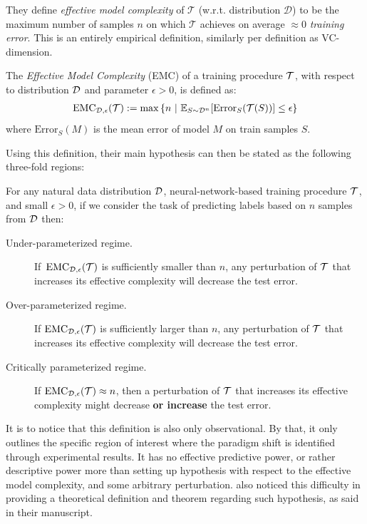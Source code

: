 \documentclass[10pt,oneside,oldfontcommands,dvipsnames,article]{memoir}
\begin{document}
They define \emph{effective model complexity} of $\mathcal{T}$ (w.r.t. distribution $\mathcal D$) to be the maximum number of samples $n$ on which $\mathcal{T}$ achieves on average $\approx 0$ \emph{training error}. This is an entirely empirical definition, similarly per definition as VC-dimension. 

\newcommand{\EMC}{\mathrm{EMC}}
\begin{definition}
The \emph{Effective Model Complexity} (EMC) of a training procedure $\mathcal{T}$, with respect to distribution $\mathcal{D}$ and parameter $\epsilon>0$,
is defined as:
\begin{align*}
    \EMC_{\cD,\eps}(\cT)
    :=  \max \left\{n ~|~ \E_{S \sim \cD^n}[ \mathrm{Error}_S( \cT( S )  ) ] \leq \eps \right\}
    \end{align*}
    where $\mathrm{Error}_S(M)$ is the mean error of model $M$ on train samples $S$.
\end{definition}

Using this definition, their main hypothesis can then be stated as the following three-fold regions:

\begin{hypothesis} \label{hyp:informaldd}
For any natural data distribution $\mathcal{D}$, neural-network-based training procedure $\mathcal{T}$, and small $\epsilon>0$,
if we consider the task of predicting labels based on  $n$ samples from $\mathcal{D}$ then:
\begin{description}
    \item[Under-parameterized regime.]  If~$\EMC_{\cD,\epsilon}(\cT)$ is sufficiently smaller than $n$, any perturbation of $\mathcal{T}$ that increases its effective complexity will decrease the test error.
    \item[Over-parameterized regime.] If $\EMC_{\cD,\epsilon}(\cT)$ is sufficiently larger than $n$,
    any perturbation of $\mathcal{T}$ that increases its effective complexity will decrease the test error.
    
    \item[Critically parameterized regime.] If $\EMC_{\cD,\epsilon}(\cT) \approx n$, then
    a perturbation of $\mathcal{T}$ that increases its effective complexity
    might decrease {\bf or increase} the test error.
\end{description}
\end{hypothesis}

It is to notice that this definition is also only observational. By that, it only outlines the specific region of interest where the paradigm shift is identified through experimental results. It has no effective predictive power, or rather descriptive power more than setting up hypothesis with respect to the effective model complexity, and some arbitrary perturbation. \cite{nakkiran_deep_2019} also noticed this difficulty in providing a theoretical definition and theorem regarding such hypothesis, as said in their manuscript. 
\end{document}
